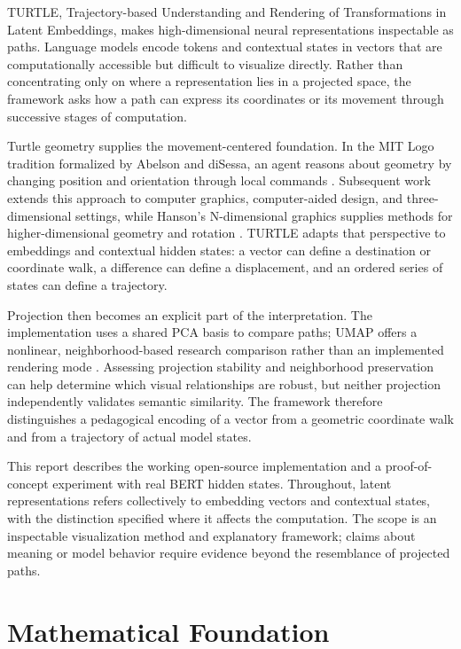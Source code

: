 \documentclass[manuscript,screen,nonacm]{acmart}
\begin{document}
TURTLE, Trajectory-based Understanding and Rendering of Transformations in Latent Embeddings, makes high-dimensional neural representations inspectable as paths. Language models encode tokens and contextual states in vectors that are computationally accessible but difficult to visualize directly. Rather than concentrating only on where a representation lies in a projected space, the framework asks how a path can express its coordinates or its movement through successive stages of computation.

Turtle geometry supplies the movement-centered foundation. In the MIT Logo tradition formalized by Abelson and diSessa, an agent reasons about geometry by changing position and orientation through local commands \cite{abelson}. Subsequent work extends this approach to computer graphics, computer-aided design, and three-dimensional settings, while Hanson's N-dimensional graphics supplies methods for higher-dimensional geometry and rotation \cite{goldman,hanson1994,hanson1995,verhoeff}. TURTLE adapts that perspective to embeddings and contextual hidden states: a vector can define a destination or coordinate walk, a difference can define a displacement, and an ordered series of states can define a trajectory.

Projection then becomes an explicit part of the interpretation. The implementation uses a shared PCA basis to compare paths; UMAP offers a nonlinear, neighborhood-based research comparison rather than an implemented rendering mode \cite{umap}. Assessing projection stability and neighborhood preservation can help determine which visual relationships are robust, but neither projection independently validates semantic similarity. The framework therefore distinguishes a pedagogical encoding of a vector from a geometric coordinate walk and from a trajectory of actual model states.

This report describes the working open-source implementation and a proof-of-concept experiment with real BERT hidden states. Throughout, latent representations refers collectively to embedding vectors and contextual states, with the distinction specified where it affects the computation. The scope is an inspectable visualization method and explanatory framework; claims about meaning or model behavior require evidence beyond the resemblance of projected paths.

\section{Mathematical Foundation}\label{mathematical-foundation}
\end{document}
